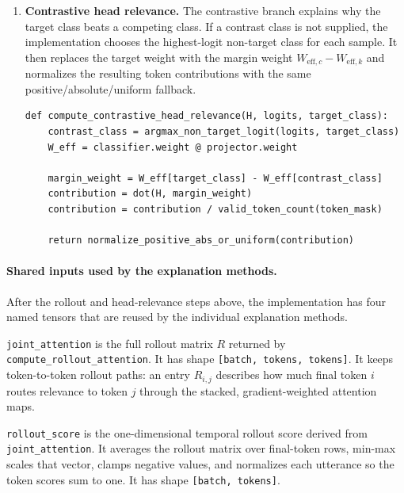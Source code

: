 \documentclass[11pt]{article}
\begin{document}
\begin{enumerate}
\begin{verbatim}
    positive = clamp_min(contribution, 0)
    absolute = abs(contribution)

    if sum(positive) > eps:
        return positive / sum(positive)
    if sum(absolute) > eps:
        return absolute / sum(absolute)
    return uniform_over_valid_tokens(token_mask)
\end{verbatim}

  \item \textbf{Contrastive head relevance.} The contrastive branch explains
  why the target class beats a competing class. If a contrast class is not
  supplied, the implementation chooses the highest-logit non-target class for
  each sample. It then replaces the target weight with the margin weight
  $W_{\mathrm{eff},c} - W_{\mathrm{eff},k}$ and normalizes the resulting token
  contributions with the same positive/absolute/uniform fallback.

\begin{verbatim}
def compute_contrastive_head_relevance(H, logits, target_class):
    contrast_class = argmax_non_target_logit(logits, target_class)
    W_eff = classifier.weight @ projector.weight

    margin_weight = W_eff[target_class] - W_eff[contrast_class]
    contribution = dot(H, margin_weight)
    contribution = contribution / valid_token_count(token_mask)

    return normalize_positive_abs_or_uniform(contribution)
\end{verbatim}
\end{enumerate}

\paragraph{Shared inputs used by the explanation methods.}
After the rollout and head-relevance steps above, the implementation has four
named tensors that are reused by the individual explanation methods.

\texttt{joint\_attention} is the full rollout matrix $R$ returned by
  \texttt{compute\_rollout\_attention}. It has shape
  \texttt{[batch, tokens, tokens]}. It keeps token-to-token rollout paths: an
  entry $R_{i,j}$ describes how much final token $i$ routes relevance to token
  $j$ through the stacked, gradient-weighted attention maps.

\texttt{rollout\_score} is the one-dimensional temporal rollout score derived
  from \texttt{joint\_attention}. It averages the rollout matrix over final-token
  rows, min-max scales that vector, clamps negative values, and normalizes each
  utterance so the token scores sum to one. It has shape
  \texttt{[batch, tokens]}.
\end{document}
